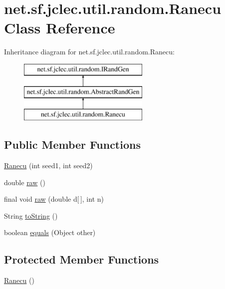 \hypertarget{classnet_1_1sf_1_1jclec_1_1util_1_1random_1_1_ranecu}{\section{net.\-sf.\-jclec.\-util.\-random.\-Ranecu Class Reference}
\label{classnet_1_1sf_1_1jclec_1_1util_1_1random_1_1_ranecu}
}
Inheritance diagram for net.\-sf.\-jclec.\-util.\-random.\-Ranecu\-:\begin{figure}[H]
\begin{center}
\leavevmode
\includegraphics[height=3.000000cm]{classnet_1_1sf_1_1jclec_1_1util_1_1random_1_1_ranecu}
\end{center}
\end{figure}
\subsection*{Public Member Functions}
\begin{DoxyCompactItemize}
\item 
\hyperlink{classnet_1_1sf_1_1jclec_1_1util_1_1random_1_1_ranecu_a892b935309a5180c0858f3e3d53ba753}{Ranecu} (int seed1, int seed2)
\item 
double \hyperlink{classnet_1_1sf_1_1jclec_1_1util_1_1random_1_1_ranecu_a53c1126cf150e51208e8718efa9ab490}{raw} ()
\item 
final void \hyperlink{classnet_1_1sf_1_1jclec_1_1util_1_1random_1_1_ranecu_ad0f6a79faf13c3b9fbbd5d3a8bced368}{raw} (double d\mbox{[}$\,$\mbox{]}, int n)
\item 
String \hyperlink{classnet_1_1sf_1_1jclec_1_1util_1_1random_1_1_ranecu_a79e873c544484f95b8ad8001814d6253}{to\-String} ()
\item 
boolean \hyperlink{classnet_1_1sf_1_1jclec_1_1util_1_1random_1_1_ranecu_ad7bc8b1efebe127a39f014feb5d65e00}{equals} (Object other)
\end{DoxyCompactItemize}
\subsection*{Protected Member Functions}
\begin{DoxyCompactItemize}
\item 
\hyperlink{classnet_1_1sf_1_1jclec_1_1util_1_1random_1_1_ranecu_a5544a8c6df551dde3114d7f1f81b4934}{Ranecu} ()
\end{DoxyCompactItemize}

